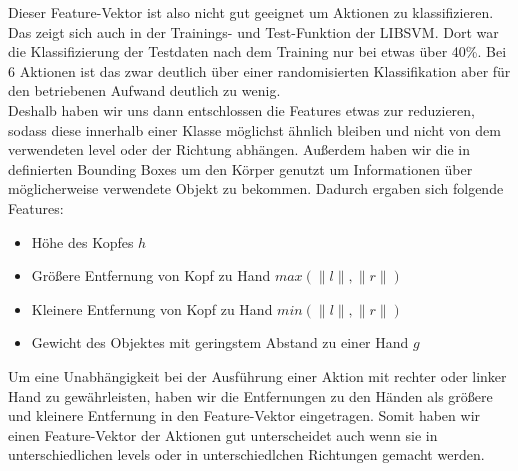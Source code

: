 Dieser Feature-Vektor ist also nicht gut geeignet um Aktionen zu klassifizieren. Das zeigt sich auch in der Trainings- und Test-Funktion der LIBSVM. Dort war die Klassifizierung der Testdaten nach dem Training nur bei etwas über 40\%. Bei 6 Aktionen ist das zwar deutlich über einer randomisierten Klassifikation aber für den betriebenen Aufwand deutlich zu wenig.\\
Deshalb haben wir uns dann entschlossen die Features etwas zur reduzieren, sodass diese innerhalb einer Klasse möglichst ähnlich bleiben und nicht von dem verwendeten level oder der Richtung abhängen. Außerdem haben wir die in \cite{scene-grok} definierten Bounding Boxes um den Körper genutzt um Informationen über möglicherweise verwendete Objekt zu bekommen. Dadurch ergaben sich folgende Features:
\begin{itemize}
    \item Höhe des Kopfes $h$
    \item Größere Entfernung von Kopf zu Hand $max(\lVert l \rVert,\lVert r \rVert)$
    \item Kleinere Entfernung von Kopf zu Hand $min(\lVert l \rVert,\lVert r \rVert)$
    \item Gewicht des Objektes mit geringstem Abstand zu einer Hand $g$
\end{itemize}
Um eine Unabhängigkeit bei der Ausführung einer Aktion mit rechter oder linker Hand zu gewährleisten, haben wir die Entfernungen zu den Händen als größere und kleinere Entfernung in den Feature-Vektor eingetragen. Somit haben wir einen Feature-Vektor der Aktionen gut unterscheidet auch wenn sie in unterschiedlichen levels oder in unterschiedlchen Richtungen gemacht werden.

